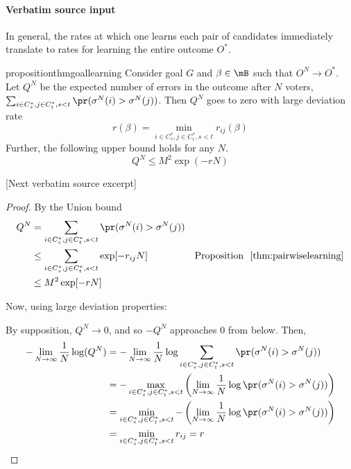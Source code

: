 \documentclass[10pt]{article}
\begin{document}
\paragraph{Verbatim source input}
\begin{ReviewVerbatim}
In general, the rates at which one learns each pair of candidates immediately translate to rates for learning the entire outcome $O^*$.

\begin{restatable}{proposition}{thmgoallearning}
	\label{thm:goal_learning}
	Consider goal $G$ and $\beta\in\mB$ such that $O^N \to O^*$. Let $Q^N$ be the expected number of errors in the outcome after $N$ voters, $\sum_{i\in C_s^*,j\in C_t^*, s < t} \pr(\sigma^N(i)>\sigma^N(j))$. Then $Q^N$ goes to zero with large deviation rate
%
	\[
	r(\beta) = \min_{i\in C_s^*,j\in C_t^*, s < t} r_{ij}(\beta) \label{eqnpart:outcomerate}
	\]
	Further, the following upper bound holds for any $N$. \[Q^N \leq M^2 \exp(-rN)\] %
%
%
%

%
\end{restatable}

[Next verbatim source excerpt]

\thmgoallearning*
\begin{proof}
%
%

By the Union bound
\begin{align*}
%
Q^N &= \sum_{i\in C_s^*,j\in C_t^*, s < t} \pr(\sigma^N(i) > \sigma^N(j)) \\
%
&\leq \sum_{i\in C_s^*,j\in C_t^*, s < t} \exp[-r_{ij}N] & \text{Proposition }~\ref{thm:pairwiselearning}\\
&\leq M^2  \exp[-rN]\\
%
%
%
%
%
%
\end{align*}

%
Now, using large deviation properties:

%
By supposition, $Q^N \to 0$, and so $-Q^N$ approaches $0$ from below.
%
Then,
\begin{align}
%
-\lim_{N\to\infty} \frac{1}{N}\log(Q^N)
&=  -\lim_{N\to\infty} \frac{1}{N}\log \sum_{i\in C_s^*,j\in C_t^*, s < t} \pr(\sigma^N(i) > \sigma^N(j))\nonumber\\
&= -\max_{i\in C_s^*,j\in C_t^*, s < t}\left(\lim_{N\to\infty} \frac{1}{N}\log \pr(\sigma^N(i) > \sigma^N(j))\right)\label{eqnstep:ldpproperty}\\
&= \min_{i\in C_s^*,j\in C_t^*, s < t}-\left(\lim_{N\to\infty} \frac{1}{N}\log \pr(\sigma^N(i) > \sigma^N(j))\right)\nonumber\\
&= \min_{i\in C_s^*,j\in C_t^*, s < t} r_{ij} = r\nonumber
\end{align}


\end{proof}
\end{ReviewVerbatim}
\end{document}
